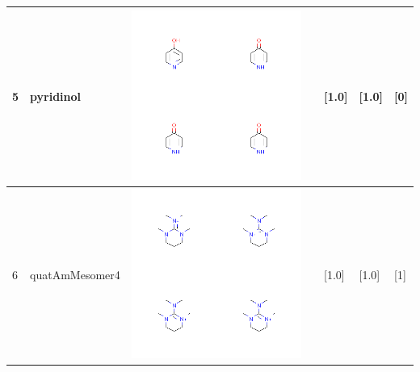 \begin{longtable}{|l|l|l|l|l|l|l|}
\hline
5 & pyridinol & \includegraphics[scale=0.6]{pyridinolMV.png} & & [1.0]& [1.0] & [0] \\
\hline
6 & quatAmMesomer4 & \includegraphics[scale=0.6]{quatAmMesomer4MV.png} & & [1.0]& [1.0] & [1] \\
\hline

\end{longtable}
